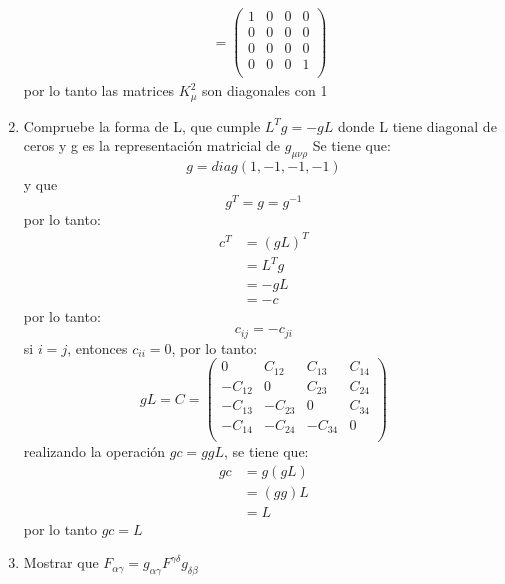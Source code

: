 \documentclass[12pt,letterpaper]{report}
\begin{document}
\begin{enumerate}
\begin{align*}
        & =\left( \begin{matrix}
            1 & 0 & 0 & 0 \\
            0 & 0 & 0 & 0 \\
            0 & 0 & 0 & 0 \\
            0 & 0 & 0 & 1 \\
        \end{matrix}\right)
    \end{align*}
    por lo tanto las matrices $K_\mu^2$ son diagonales con 1
    \item Compruebe la forma de L, que cumple $L^Tg=-gL$ donde L tiene diagonal de ceros y g es la representación matricial de $g_{\mu \nu \rho}$
    Se tiene que:
    \begin{equation*}
        g=diag(1,-1,-1,-1)
    \end{equation*}
    y que
    \begin{equation*}
        g^T=g=g^{-1}
    \end{equation*}
    por lo tanto:
    \begin{align*}
        c^T&= (gL)^T \\
        &=L^T g \\
        &=-gL\\
        &=-c
    \end{align*}
    por lo tanto:
    \begin{equation*}
        c_{ij}=-c_{ji}
    \end{equation*}
    si $i=j$, entonces $c_{ii}=0$, por lo tanto:
    \begin{equation*}
        gL=C=\left(\begin{matrix}
            0 & C_{12} & C_{13} & C_{14} \\
            -C_{12} & 0 & C_{23} & C_{24} \\
            -C_{13} & -C_{23} & 0 & C_{34} \\
            -C_{14} & -C_{24} & -C_{34} & 0 \\
        \end{matrix}\right)
    \end{equation*}
    realizando la operación $gc=ggL$, se tiene que:
    \begin{align*}
        gc&=g(gL)\\
        &=(gg)L\\
        &=L
    \end{align*}
    por lo tanto $gc=L$
    \item Mostrar que $F_{\alpha\gamma}=g_{\alpha\gamma}F^{\gamma \delta}g_{\delta \beta }$\\

\end{enumerate}
\end{document}
